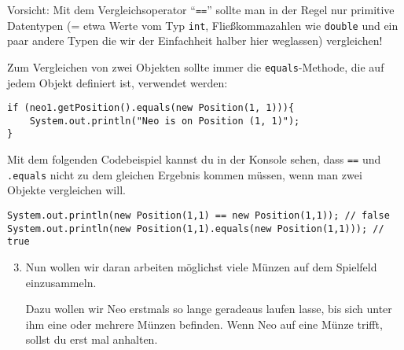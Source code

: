 \begin{Infobox}[\lstinline{==} und die \lstinline{equals()}-Methode]
	Vorsicht: Mit dem Vergleichsoperator \enquote{\lstinline{==}} sollte man in der Regel nur primitive Datentypen (= etwa Werte vom Typ \lstinline{int}, Fließkommazahlen wie \lstinline{double} und ein paar andere Typen die wir der Einfachheit halber hier weglassen) vergleichen!\newline

	Zum Vergleichen von zwei Objekten sollte immer die \lstinline{equals}-Methode, die auf jedem Objekt definiert ist, verwendet werden:

	\begin{lstlisting}[numbers=none]
if (neo1.getPosition().equals(new Position(1, 1))){
	System.out.println("Neo is on Position (1, 1)");
}
	\end{lstlisting}

	Mit dem folgenden Codebeispiel kannst du in der Konsole sehen, dass \lstinline{==} und \lstinline{.equals} nicht zu dem gleichen Ergebnis kommen müssen, wenn man zwei Objekte vergleichen will.

	\begin{lstlisting}[numbers=none]
System.out.println(new Position(1,1) == new Position(1,1)); // false
System.out.println(new Position(1,1).equals(new Position(1,1))); // true
	\end{lstlisting}

\end{Infobox}


\begin{enumerate}\setcounter{enumi}{2}
	\item
	 	Nun wollen wir daran arbeiten möglichst viele Münzen auf dem Spielfeld einzusammeln.

		Dazu wollen wir Neo erstmals so lange geradeaus laufen lasse, bis sich unter ihm eine oder mehrere Münzen befinden.
		Wenn Neo auf eine Münze trifft, sollst du erst mal anhalten.
\end{enumerate}


